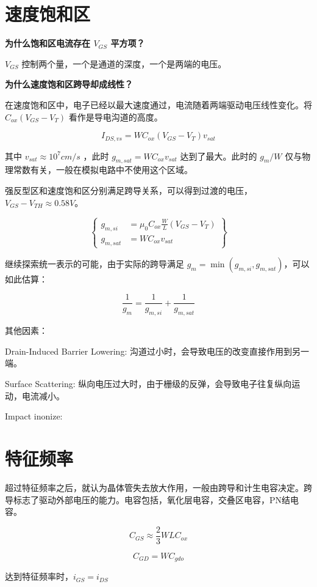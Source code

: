 \documentclass[cn,11pt,chinese,black,simple]{../elegantbook}
\begin{document}
\section{速度饱和区}

\textbf{为什么饱和区电流存在 \(V_{GS}\) 平方项？}

\(V_{GS}\) 控制两个量，一个是通道的深度，一个是两端的电压。

\textbf{为什么速度饱和区跨导却成线性？}

在速度饱和区中，电子已经以最大速度通过，电流随着两端驱动电压线性变化。将 \(C_{ox} (V_{GS} - V_T) \) 看作是导电沟道的高度。

\[I_{DS,{vs}} = W C_{ox} (V_{GS} - V_T) v_{sat}\]

其中 \(v_{sat} \approx 10^7 cm/s\) ，此时 \(g_{m,sat} = W C_{ox} v_{sat}\) 达到了最大。此时的 \(g_m/W\) 仅与物理常数有关，一般在模拟电路中不使用这个区域。

强反型区和速度饱和区分别满足跨导关系，可以得到过渡的电压，\(V_{GS} - V_{TH} \approx 0.58 V \)。

\[\left\{\begin{aligned}
    g_{m,si} &= \mu_0 C_{ox} \frac{W}{L} (V_{GS} - V_T) \\
    g_{m,sat} &= W C_{ox} v_{sat}
\end{aligned}\right\}\]

继续探索统一表示的可能，由于实际的跨导满足 \(g_m = \min (g_{m,si}, g_{m,sat})\)，可以如此估算：

\[\frac{1}{g_m} = \frac{1}{g_{m,si}} + \frac{1}{g_{m,sat}}\]


其他因素：

Drain-Induced Barrier Lowering: 沟道过小时，会导致电压的改变直接作用到另一端。

Surface Scattering: 纵向电压过大时，由于栅级的反弹，会导致电子往复纵向运动，电流减小。

Impact inonize: 

\section{特征频率}

超过特征频率之后，就认为晶体管失去放大作用，一般由跨导和计生电容决定。跨导标志了驱动外部电压的能力。电容包括，氧化层电容，交叠区电容，PN结电容。

\[C_{GS} \approx\frac{2}{3} WLC_{ox}\]

\[C_{GD} = W C_{gdo}\]

达到特征频率时，\(i_{GS} = i_{DS}\) 
\end{document}
